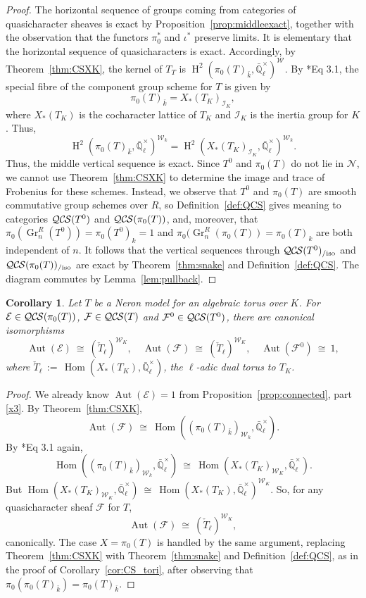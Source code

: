 \documentclass[10pt]{amsart}
\theoremstyle{plain}
\newtheorem{corollary}[theorem]{Corollary}
\theoremstyle{definition}
\theoremstyle{remark}
\newcommand{\EE}{\mathbb{\bar Q}_\ell}
\newcommand{\bFq}{\bar{k}}
\newcommand{\Fq}{k}
\newcommand{\EEx}{\EE^\times}
\newcommand{\Weil}[1]{\mathcal{W}_{#1}}
\DeclareMathOperator{\Aut}{Aut}
\DeclareMathOperator{\Hom}{Hom}
\DeclareMathOperator{\Gr}{Gr}
\DeclareMathOperator{\Hh}{H}
\newcommand{\ceq}{{\, :=\, }}
\newcommand{\iso}{{\ \cong\ }}
\newcommand{\TrFrob}[1]{T_{#1}}
\newcommand{\cs}[1]{{\mathcal{#1}}}
\newcommand{\QCS}{{\mathcal{QC\hskip-0.8pt S}}}
\newcommand{\QCSiso}[1]{\QCS(#1)_{/\text{iso}}}
\begin{document}
\begin{proof} 
The horizontal sequence of groups coming from categories of quasicharacter sheaves is exact by Proposition~\ref{prop:middleexact}, together with the observation that the functors $\pi_0^*$ and $\iota^*$ preserve limits.
It is elementary that the horizontal sequence of quasicharacters is exact.
Accordingly, by Theorem~\ref{thm:CSXK}, the kernel of $\TrFrob{T}$ is $\Hh^2(\pi_0(T)_{\bFq},\EEx)^{\Weil{}}$. 
By \cite{bitan:discriminant}*{Eq 3.1}, the special fibre of the component group scheme for $T$ is given by
\[
 \pi_0(T)_{\bFq} = X_*(T_K)_{\mathcal{I}_K},
\]
where $X_*(T_K)$ is the cocharacter lattice of $T_K$ and $\mathcal{I}_K$ is the inertia group for $K$.
Thus,
\[
\Hh^2(\pi_0(T)_{\bFq},\EEx)^{\Weil{\Fq}} = \Hh^2(X_*(T_K)_{\mathcal{I}_K},\EEx)^{\Weil{\Fq}}.
\] 
Thus, the middle vertical sequence is exact.
Since $T^0$ and $\pi_0(T)$ do not lie in $\mathcal{N}$, we cannot use Theorem~\ref{thm:CSXK} to determine the image and trace of Frobenius for these schemes. 
Instead, we observe that $T^0$ and $\pi_0(T)$ are smooth commutative group schemes over $R$, so Definition~\ref{def:QCS} gives meaning to categories $\QCS(T^0)$ and $\QCS(\pi_0(T))$, and, moreover, that $\pi_0(\Gr^R_n(T^0))= \pi_0(T^0)_{\Fq} = 1$ and $\pi_0(\Gr^R_n(\pi_0(T)) = \pi_0(T)_{\Fq}$ are both independent of $n$.
It follows that the vertical sequences through $\QCSiso{T^0}$ and $\QCSiso{\pi_0(T)}$ are exact by Theorem~\ref{thm:snake} and Definition~\ref{def:QCS}.
The diagram commutes by Lemma~\ref{lem:pullback}.
\end{proof}

\begin{corollary}
Let $T$ be a Neron model for an algebraic torus over $K$.
For $\cs{E}\in \QCS(\pi_0(T))$, $\cs{F}\in {\QCS(T)}$ and $\cs{F}^0\in {\QCS(T^0)}$, there are canonical isomorphisms
\[
\Aut(\cs{E})\iso (\check{T}_\ell)^{\Weil{K}},
\quad
\Aut(\cs{F})\iso (\check{T}_\ell)^{\Weil{K}},
\quad
\Aut(\cs{F}^0)\iso 1,
\]
 where $\check{T}_\ell \ceq \Hom(X_*(T_K),\EEx)$, the $\ell$-adic dual torus to $T_K$.
\end{corollary}

\begin{proof}
We already know $\Aut(\cs{E}) =1$ from Proposition~\ref{prop:connected}, part \ref{x3}.
By Theorem~\ref{thm:CSXK}, 
\[
\Aut(\cs{F})  \iso \Hom((\pi_0(T)_{\bFq})_{\Weil{\Fq}},\EEx).
\]
By \cite{bitan:discriminant}*{Eq 3.1} again, 
\[
\Hom((\pi_0(T)_{\bFq})_{\Weil{\Fq}},\EEx) \iso
\Hom(X_*(T_K)_{\Weil{K}},\EEx).
\]
But $\Hom(X_*(T_K)_{\Weil{K}},\EEx) \iso \Hom(X_*(T_K),\EEx)^{\Weil{K}}$.
So, for any quasicharacter sheaf $\cs{F}$ for $T$,
\[
\Aut(\cs{F}) \iso (\check{T}_\ell)^{\Weil{K}},
\]
canonically.
The case $X= \pi_0(T)$ is handled by the same argument, replacing Theorem~\ref{thm:CSXK} with Theorem~\ref{thm:snake} and Definition~\ref{def:QCS}, as in the proof of Corollary~\ref{cor:CS_tori}, after observing that $\pi_0(\pi_0(T)_{\bFq}) = \pi_0(T)_{\bFq}$.
\end{proof}
\end{document}
